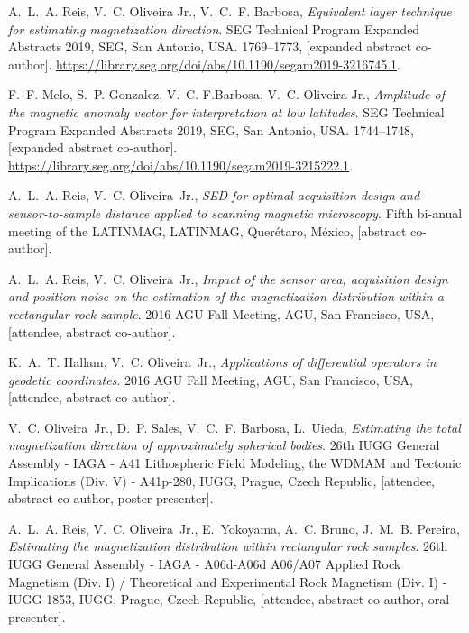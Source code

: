 \begin{thebibliography}{10}
A.~L.~A. Reis, V.~C. Oliveira{ }Jr., V.~C.~F. Barbosa, \emph{Equivalent layer
  technique for estimating magnetization direction}. {SEG
  Technical Program Expanded Abstracts 2019}, SEG, San Antonio, USA.
  1769--1773, [expanded abstract co-author].
  \url{https://library.seg.org/doi/abs/10.1190/segam2019-3216745.1}.

F.~F. Melo, S.~P. Gonzalez, V.~C. F.Barbosa, V.~C. Oliveira{ }Jr.,
  \emph{Amplitude of the magnetic anomaly vector for interpretation at low
  latitudes}. {SEG Technical Program Expanded Abstracts 2019},
  SEG, San Antonio, USA. 1744--1748, [expanded abstract co-author].
  \url{https://library.seg.org/doi/abs/10.1190/segam2019-3215222.1}.

A.~L.~A. Reis, V.~C. Oliveira~Jr., \emph{SED for optimal acquisition design and
  sensor-to-sample distance applied to scanning magnetic microscopy}. 
  {Fifth bi-anual meeting of the LATINMAG}, LATINMAG, Quer\'{e}taro,
  M\'{e}xico, [abstract co-author].

A.~L.~A. Reis, V.~C. Oliveira~Jr., \emph{Impact of the sensor area, acquisition
  design and position noise on the estimation of the magnetization distribution
  within a rectangular rock sample}. {2016 AGU Fall Meeting}, AGU,
  San Francisco, USA, [attendee, abstract co-author].

K.~A.~T. Hallam, V.~C. Oliveira~Jr., \emph{Applications of differential
  operators in geodetic coordinates}. {2016 AGU Fall Meeting},
  AGU, San Francisco, USA, [attendee, abstract co-author].

V.~C. Oliveira~Jr., D.~P. Sales, V.~C.~F. Barbosa, L.~Uieda, \emph{Estimating
  the total magnetization direction of approximately spherical bodies}. 
  {26th IUGG General Assembly - IAGA - A41 Lithospheric Field Modeling,
  the WDMAM and Tectonic Implications (Div. V) - A41p-280}, IUGG, Prague, Czech
  Republic, [attendee, abstract co-author, poster presenter].

A.~L.~A. Reis, V.~C. Oliveira~Jr., E.~Yokoyama, A.~C. Bruno, J.~M.~B. Pereira,
  \emph{Estimating the magnetization distribution within rectangular rock
  samples}. {26th IUGG General Assembly - IAGA - A06d-A06d A06/A07
  Applied Rock Magnetism (Div. I) / Theoretical and Experimental Rock Magnetism
  (Div. I) - IUGG-1853}, IUGG, Prague, Czech Republic, [attendee, abstract
  co-author, oral presenter].


\end{thebibliography}
